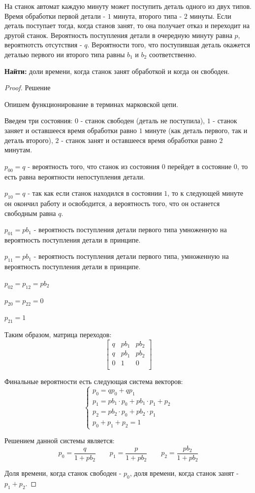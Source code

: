 \documentclass[aps,%
12pt,%
final,%
oneside,
onecolumn,%
musixtex, %
superscriptaddress,%
centertags]{article} %
\theoremstyle{plain}
\theoremstyle{definition}
\theoremstyle{remark}
\begin{document}
На станок автомат каждую минуту может поступить деталь одного из двух типов. Время обработки первой детали  - $1$ минута, второго типа - $2$ минуты. Если деталь поступает тогда, когда станов занят, то она получает отказ и переходит на другой станок. Вероятность поступления детали в очередную минуту равна $p$, вероятнотсть отсутствия - $q$. Вероятности того, что поступившая деталь окажется деталью первого ии второго типа равны $b_1$ и $b_2$ соответственно.

\textbf{Найти:} доли времени, когда станок занят обработкой и когда он свободен.
\begin{proof} Решение

	Опишем функционирование в терминах марковской цепи.

	Введем три состояния: $0$ - станок свободен (деталь не поступила), $1$ - станок заняет и оставшееся время обработки равно $1$ минуте (как деталь первого, так и деталь второго), $2$ - станок занят и оставшееся время обработки равно $2$ минутам.

	$p_{00} = q$ - вероятность того, что станок из состояния $0$ перейдет в состояние $0$, то есть равна вероятности непоступления детали.

	$p_{10} = q$ - так как если станок находился в состоянии $1$, то к следующей минуте он окончил работу и освободится, а вероятность того, что он останется свободным равна $q$.

	$p_{01} = pb_1$ - вероятность поступления детали первого типа умноженную на вероятность поступления детали в принципе.

	$p_{11} = pb_1$ - вероятность поступления детали первого типа, умноженную на вероятность поступления детали в принципе.

	$p_{02} = p_{12} = pb_2$

	$p_{20} = p_{22} = 0$

	$p_{21} = 1$

	Таким образом, матрица переходов:
	$$\begin{bmatrix}
		q & pb_1 & pb_2 \\
		q & pb_1 & pb_2 \\
		0 & 1 & 0 \\
	\end{bmatrix}$$

	Финальные вероятности есть следующая система векторов:
	$$\begin{cases}
		p_0 = qp_0 + qp_1 \\
		p_1 = pb_1 \cdot p_0 + pb_1 \cdot p_1 + p_2 \\
		p_2 = pb_2 \cdot p_0 + pb_2 \cdot p_1 \\
		p_0 + p_1 + p_2 =  1
	\end{cases}$$

	Решением данной системы является:
	$$p_0 = \frac{q}{1+pb_2} \qquad p_1 = \frac{p}{1+pb_2} \qquad p_2 = \frac{pb_2}{1+pb_2}$$

	Доля времени, когда станок свободен  - $p_0$, доля времени, когда станок занят - $p_1+p_2$.
\end{proof}
\end{document}
